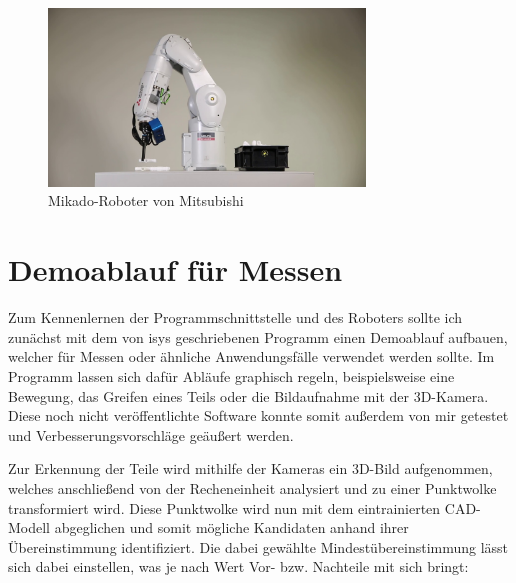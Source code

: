 \documentclass[xcolor=dvipsnames,11pt,paper=a4paper]{report}
\begin{document}
\begin{figure}[H]
	\begin{center}
		\includegraphics[width=0.75\textwidth]{media/mikado-roboter.jpg}
		\caption{Mikado-Roboter von Mitsubishi}
		\label{fig:mikado-roboter}
	\end{center}
\end{figure}



\section{Demoablauf für Messen}

Zum Kennenlernen der Programmschnittstelle und des Roboters sollte ich zunächst
mit dem von isys geschriebenen Programm einen Demoablauf aufbauen, welcher für
Messen oder ähnliche Anwendungsfälle verwendet werden sollte. Im Programm lassen
sich dafür Abläufe graphisch regeln, beispielsweise eine Bewegung, das Greifen
eines Teils oder die Bildaufnahme mit der 3D-Kamera. Diese noch nicht veröffentlichte
Software konnte somit außerdem von mir getestet und Verbesserungsvorschläge geäußert
werden.

Zur Erkennung der Teile wird mithilfe der Kameras ein 3D-Bild aufgenommen, welches
anschließend von der Recheneinheit analysiert und zu einer Punktwolke transformiert
wird. Diese Punktwolke wird nun mit dem eintrainierten CAD-Modell abgeglichen und
somit mögliche Kandidaten anhand ihrer Übereinstimmung identifiziert. Die dabei
gewählte Mindestübereinstimmung lässt sich dabei einstellen, was je nach Wert
Vor- bzw. Nachteile mit sich bringt:
\end{document}
